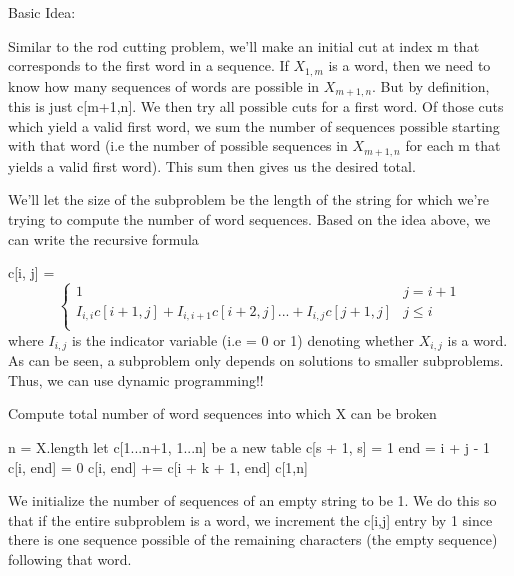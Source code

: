 \documentclass[11pt,a4paper]{article}
\begin{document}
Basic Idea: 

Similar to the rod cutting problem, we'll make an initial cut at index m that corresponds to the first word in a sequence. If $X_{1,m}$ is a word, then we need to know how many sequences of words are possible in $X_{m+1, n}$. But by definition, this is just c[m+1,n]. We then try all possible cuts for a first word. Of those cuts which yield a valid first word, we sum the number of sequences possible starting with that word (i.e the number of possible sequences in $X_{m+1,n}$ for each m that yields a valid first word). This sum then gives us the desired total.

We'll let the size of the subproblem be the length of the string for which we're trying to compute the number of word sequences. Based on the idea above, we can write the recursive formula

c[i, j] = 
\[ \begin{cases} 
      1 & j = i + 1 \\
      I_{i,i}c[i+1,j] + I_{i,i+1}c[i+2,j] ... + I_{i,j}c[j+1,j] & j \leq i \\
   \end{cases}
\]
where $I_{i,j}$ is the indicator variable (i.e = 0 or 1) denoting whether $X_{i,j}$ is a word. As can be seen, a subproblem only depends on solutions to smaller subproblems. Thus, we can use dynamic programming!!

\begin{algorithm}
\caption{Compute total number of word sequences into which X can be broken}
\begin{algorithmic}[1]
	\State n = X.length
	\State let c[1...n+1, 1...n] be a new table
	 
		\State c[s + 1, s] = 1
	\EndFor
	  
		  
			\State end = i + j - 1 
			\State c[i, end] = 0   
			  
					\State c[i, end] += c[i + k + 1, end]
				\EndIf
			\EndFor
		\EndFor
	\EndFor
	\State \Return c[1,n]
\EndFunction
\end{algorithmic}
\end{algorithm}

We initialize the number of sequences of an empty string to be 1. We do this so that if the entire subproblem is a word, we increment the c[i,j] entry by 1 since there is one sequence possible of the remaining characters (the empty sequence) following that word. 
\end{document}
